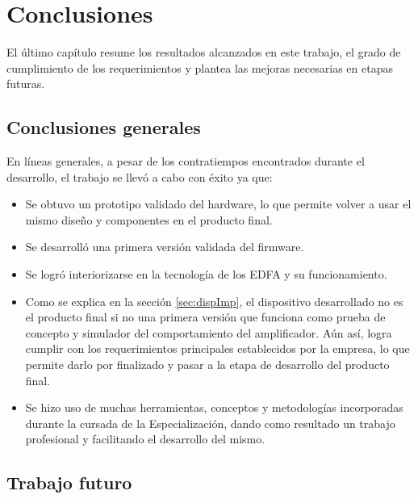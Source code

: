 
\chapter{Conclusiones} %

\label{Chapter5} %



El último capítulo resume los resultados alcanzados en este trabajo, el grado de cumplimiento de los requerimientos y plantea las mejoras necesarias en etapas futuras.

\section{Conclusiones generales}

En líneas generales, a pesar de los contratiempos encontrados durante el desarrollo, el trabajo se llevó a cabo con éxito ya que:  

\begin{itemize}
\item Se obtuvo un prototipo validado del hardware, lo que permite volver a usar el mismo diseño y componentes en el producto final.
\item Se desarrolló una primera versión validada del firmware.
\item Se logró interiorizarse en la tecnología de los EDFA y su funcionamiento.
\item Como se explica en la sección \ref{sec:dispImp}, el dispositivo desarrollado no es el producto final si no una primera versión que funciona como prueba de concepto y simulador del comportamiento del amplificador. Aún así, logra cumplir con los requerimientos principales establecidos por la empresa, lo que permite darlo por finalizado y pasar a la etapa de desarrollo del producto final.
\item Se hizo uso de muchas herramientas, conceptos y metodologías incorporadas durante la cursada de la Especialización, dando como resultado un trabajo profesional y facilitando el desarrollo del mismo.
\end{itemize}

\section{Trabajo futuro}

